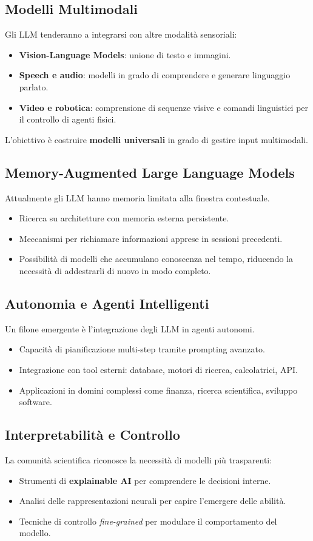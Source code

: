 \subsection{Modelli Multimodali}
Gli LLM tenderanno a integrarsi con altre modalità sensoriali:
\begin{itemize}
    \item \textbf{Vision-Language Models}: unione di testo e immagini.
    \item \textbf{Speech e audio}: modelli in grado di comprendere e generare linguaggio parlato.
    \item \textbf{Video e robotica}: comprensione di sequenze visive e comandi linguistici per il controllo di agenti fisici.
\end{itemize}
L'obiettivo è costruire \textbf{modelli universali} in grado di gestire input multimodali.

\subsection{Memory-Augmented Large Language Models}
Attualmente gli LLM hanno memoria limitata alla finestra contestuale.
\begin{itemize}
    \item Ricerca su architetture con memoria esterna persistente.
    \item Meccanismi per richiamare informazioni apprese in sessioni precedenti.
    \item Possibilità di modelli che accumulano conoscenza nel tempo, riducendo la necessità di addestrarli di nuovo in modo completo.
\end{itemize}

\subsection{Autonomia e Agenti Intelligenti}
Un filone emergente è l'integrazione degli LLM in agenti autonomi.
\begin{itemize}
    \item Capacità di pianificazione multi-step tramite prompting avanzato.
    \item Integrazione con tool esterni: database, motori di ricerca, calcolatrici, API.
    \item Applicazioni in domini complessi come finanza, ricerca scientifica, sviluppo software.
\end{itemize}

\subsection{Interpretabilità e Controllo}
La comunità scientifica riconosce la necessità di modelli più trasparenti:
\begin{itemize}
    \item Strumenti di \textbf{explainable AI} per comprendere le decisioni interne.
    \item Analisi delle rappresentazioni neurali per capire l'emergere delle abilità.
    \item Tecniche di controllo \textit{fine-grained} per modulare il comportamento del modello.
\end{itemize}

